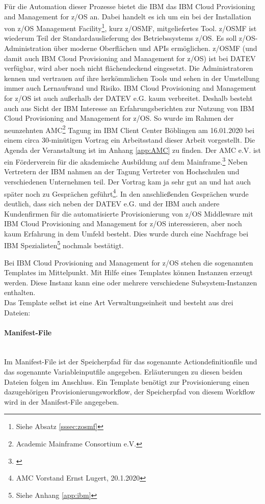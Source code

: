 Für die Automation dieser Prozesse bietet die IBM das \glqq IBM Cloud Provisioning and Management for z/OS\grqq{} an.
Dabei handelt es ich um ein bei der Installation von \glqq z/OS Management Facility\grqq{}\footnote{Siehe Absatz \ref{sssec:zosmf}}, kurz z/OSMF, mitgeliefertes Tool.
z/OSMF ist wiederum Teil der Standardauslieferung des Betriebssystems z/OS. 
Es soll z/OS-Administration über moderne Oberflächen und APIs  ermöglichen.
z/OSMF (und damit auch \glqq IBM Cloud Provisioning and Management for z/OS\grqq) ist bei DATEV verfügbar, wird aber noch nicht flächendeckend eingesetzt. 
Die Administratoren kennen und vertrauen auf ihre herkömmlichen Tools und sehen in der Umstellung immer auch Lernaufwand und Risiko.
\glqq IBM Cloud Provisioning and Management for z/OS\grqq{} ist auch außerhalb der DATEV e.G. kaum verbreitet. 
Deshalb besteht auch aus Sicht der IBM  Interesse an Erfahrungsberichten zur Nutzung von \glqq IBM Cloud Provisioning and Management for z/OS\grqq.
So wurde im Rahmen der neunzehnten \glqq AMC\grqq{}\footnote{Academic Mainframe Consortium e.V.} Tagung im IBM Client Center Böblingen am 16.01.2020  bei einem circa 30-minütigen Vortrag ein Arbeitsstand dieser Arbeit vorgestellt.
Die Agenda der Veranstaltung ist im Anhang \ref{app:AMC} zu finden.
Der AMC e.V. ist ein Förderverein für die akademische Ausbildung auf dem Mainframe.\footnote{\cite{.23.2.2020}}
Neben Vertretern der IBM nahmen an der Tagung Vertreter von Hochschulen und verschiedenen Unternehmen teil.
Der Vortrag \glqq kam ja sehr gut an und hat auch später noch zu Gesprächen geführt\grqq\footnote{AMC Vorstand Ernst Lugert, 20.1.2020}. 
In den anschließenden Gesprächen wurde deutlich, dass sich neben der DATEV e.G. und der IBM auch andere Kundenfirmen für die automatisierte Provisionierung von z/OS Middleware mit \glqq IBM Cloud Provisioning and Management for z/OS\grqq{} interessieren, aber noch kaum Erfahrung in dem Umfeld besteht.
Dies wurde durch eine Nachfrage bei IBM Spezialisten\footnote{Siehe Anhang \ref{app:ibm}} nochmals bestätigt.

Bei \glqq IBM Cloud Provisioning and Management for z/OS\grqq{} stehen die sogenannten \glqq Templates\grqq{} im Mittelpunkt.
Mit Hilfe eines Templates können Instanzen erzeugt werden.
Diese Instanz kann eine oder mehrere verschiedene Subsystem-Instanzen enthalten.
\\Das Template selbst ist eine Art \glqq Verwaltungseinheit\grqq{} und besteht aus drei Dateien:

\paragraph{\glqq Manifest-File\grqq} ~\\
Im Manifest-File ist der Speicherpfad für das sogenannte \glqq Actiondefinitionfile\grqq{} und das sogenannte \glqq Variableinputfile\grqq{} angegeben.
Erläuterungen zu diesen beiden Dateien folgen im Anschluss.
Ein Template benötigt zur Provisionierung einen dazugehörigen Provisionierungsworkflow, der Speicherpfad von diesem Workflow wird in der Manifest-File angegeben.
\cite{.26.2.2020}

